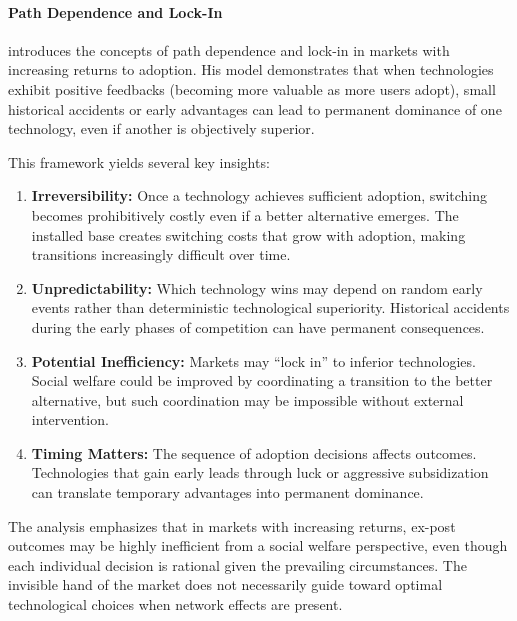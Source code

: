\paragraph{Path Dependence and Lock-In}

 introduces the concepts of path dependence and lock-in in markets with increasing returns to adoption. His model demonstrates that when technologies exhibit positive feedbacks (becoming more valuable as more users adopt), small historical accidents or early advantages can lead to permanent dominance of one technology, even if another is objectively superior.

This framework yields several key insights:

\begin{enumerate}
    \item \textbf{Irreversibility:} Once a technology achieves sufficient adoption, switching becomes prohibitively costly even if a better alternative emerges. The installed base creates switching costs that grow with adoption, making transitions increasingly difficult over time.
    
    \item \textbf{Unpredictability:} Which technology wins may depend on random early events rather than deterministic technological superiority. Historical accidents during the early phases of competition can have permanent consequences.
    
    \item \textbf{Potential Inefficiency:} Markets may ``lock in'' to inferior technologies. Social welfare could be improved by coordinating a transition to the better alternative, but such coordination may be impossible without external intervention.
    
    \item \textbf{Timing Matters:} The sequence of adoption decisions affects outcomes. Technologies that gain early leads through luck or aggressive subsidization can translate temporary advantages into permanent dominance.
\end{enumerate}

The analysis emphasizes that in markets with increasing returns, ex-post outcomes may be highly inefficient from a social welfare perspective, even though each individual decision is rational given the prevailing circumstances. The invisible hand of the market does not necessarily guide toward optimal technological choices when network effects are present.

